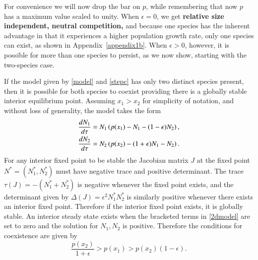 For convenience we will now drop the bar on $p$, while remembering that now $p$ has a maximum value scaled to unity. When $\epsilon=0$, we get \textbf{relative size independent, neutral competition,} and because one species has the inherent advantage in that it experiences a higher population growth rate, only one species can exist, as shown in Appendix~\ref{appendix1b}.
When $\epsilon>0$, however, it is possible for more than one species to persist, as we now show, starting with the two-species case.

If the model given by \eqref{model} and \eqref{stepc} has only two distinct species present, then it is possible for both species to coexist providing there is a globally stable interior equilibrium point. Assuming $x_1>x_2$ for simplicity of notation, and without loss of generality, the model takes the form
\begin{align}
\label{2dmodel}
\frac{d N_{1}}{d\tau}&=N_{1}\left(p(x_1)-N_{1}-(1-\epsilon)N_{2}\right), \notag \\
\frac{d N_{2}}{d\tau}&=N_{2} \left(p(x_2)-(1+\epsilon)N_{1}-N_{2}\right).
\end{align}
For any interior fixed point to be stable the Jacobian matrix $J$ at the fixed point $N^*=(N_{1}^*,N_{2}^*)$ must have negative trace and positive determinant. The trace $\tau(J)=-(N_{1}^*+N_{2}^*)$ is negative whenever the fixed point exists, and the determinant given by $\Delta(J)=\epsilon^2 N_{1}^* N_{2}^*$ is similarly positive whenever there exists an interior fixed point. Therefore if the interior fixed point exists, it is globally stable. An interior steady state exists when the bracketed terms in \eqref{2dmodel} are set to zero and the solution for $N_{1},N_{2}$ is positive. Therefore the conditions for coexistence are given by
\begin{equation}
\label{2dcond}
\frac{p(x_2)}{1+\epsilon}>p(x_1)>p(x_2)(1-\epsilon).
\end{equation}


